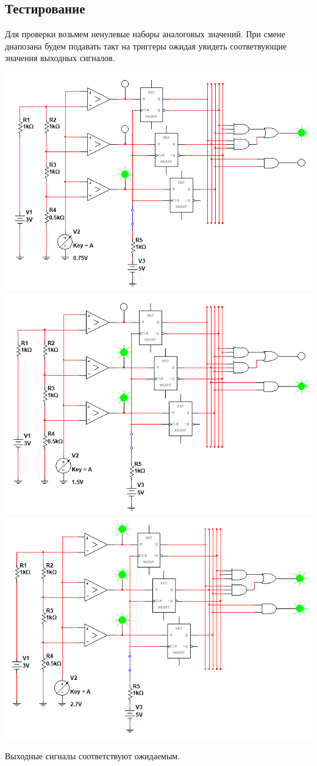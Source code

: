 \newpage

\subsection*{Тестирование}

Для проверки возьмем ненулевые наборы аналоговых значений. При смене диапозана будем подавать такт на триггеры
ожидая увидеть соответвующие значения выходных сигналов.

\begin{center}
    \includegraphics[width=.5\textwidth]{images/image-2.png}\hfill
    \includegraphics[width=.5\textwidth]{images/image-3.png}\hfill
    \includegraphics[width=.5\textwidth]{images/image-4.png}
\end{center}

Выходные сигналы соответствуют ожидаемым.